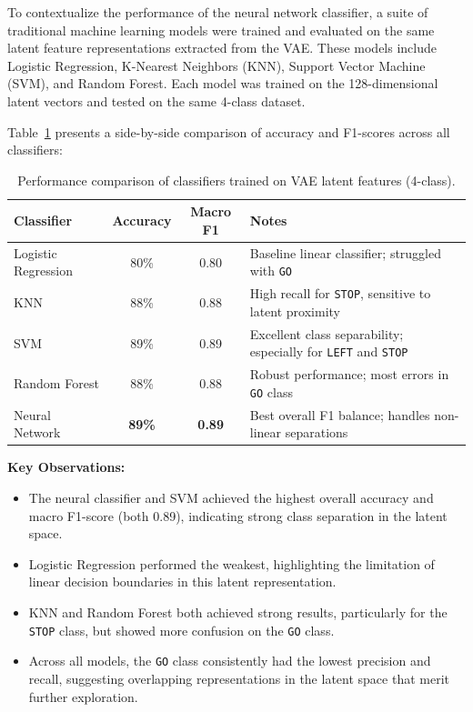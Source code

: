 To contextualize the performance of the neural network classifier, a suite of traditional machine learning models were trained and evaluated on the same latent feature representations extracted from the VAE. These models include Logistic Regression, K-Nearest Neighbors (KNN), Support Vector Machine (SVM), and Random Forest. Each model was trained on the 128-dimensional latent vectors and tested on the same 4-class dataset.

Table~\ref{tab:classifier_comparison} presents a side-by-side comparison of accuracy and F1-scores across all classifiers:

\begin{table}[h]
\centering
\small 
\begin{tabular}{p{2.5cm}ccp{3.5cm}}
\toprule
\textbf{Classifier} & \textbf{Accuracy} & \textbf{Macro F1} & \textbf{Notes} \\
\midrule
Logistic Regression & 80\% & 0.80 & Baseline linear classifier; struggled with \texttt{GO} \\[2pt]
KNN & 88\% & 0.88 & High recall for \texttt{STOP}, sensitive to latent proximity \\[2pt]
SVM & 89\% & 0.89 & Excellent class separability; especially for \texttt{LEFT} and \texttt{STOP} \\[2pt]
Random Forest & 88\% & 0.88 & Robust performance; most errors in \texttt{GO} class \\[2pt]
Neural Network & \textbf{89\%} & \textbf{0.89} & Best overall F1 balance; handles non-linear separations \\
\bottomrule
\end{tabular}
\caption{Performance comparison of classifiers trained on VAE latent features (4-class).}
\label{tab:classifier_comparison}
\end{table}

\textbf{Key Observations:}
\begin{itemize}
    \item The neural classifier and SVM achieved the highest overall accuracy and macro F1-score (both 0.89), indicating strong class separation in the latent space.
    \item Logistic Regression performed the weakest, highlighting the limitation of linear decision boundaries in this latent representation.
    \item KNN and Random Forest both achieved strong results, particularly for the \texttt{STOP} class, but showed more confusion on the \texttt{GO} class.
    \item Across all models, the \texttt{GO} class consistently had the lowest precision and recall, suggesting overlapping representations in the latent space that merit further exploration.
\end{itemize}

